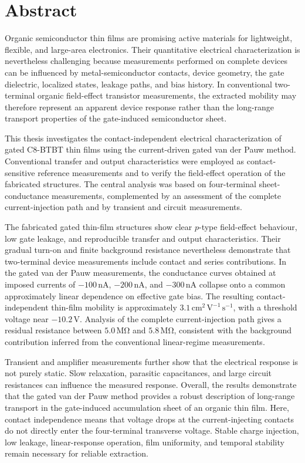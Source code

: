 \chapter*{Abstract}
\thispagestyle{plain}

Organic semiconductor thin films are promising active materials for lightweight,
flexible, and large-area electronics. Their quantitative electrical
characterization is nevertheless challenging because measurements performed on
complete devices can be influenced by metal-semiconductor contacts, device
geometry, the gate dielectric, localized states, leakage paths, and bias history.
In conventional two-terminal organic field-effect transistor measurements, the
extracted mobility may therefore represent an apparent device response rather
than the long-range transport properties of the gate-induced semiconductor
sheet.

This thesis investigates the contact-independent electrical characterization
of gated C8-BTBT thin films using the current-driven gated van der Pauw method.
Conventional transfer and output characteristics were employed as
contact-sensitive reference measurements and to verify the field-effect
operation of the fabricated structures. The central analysis was based on
four-terminal sheet-conductance measurements, complemented by an assessment of
the complete current-injection path and by transient and circuit measurements.

The fabricated gated thin-film structures show clear $p$-type field-effect
behaviour, low gate leakage, and reproducible transfer and output
characteristics. Their gradual turn-on and finite background resistance
nevertheless demonstrate that two-terminal device measurements include contact
and series contributions. In the gated van der Pauw measurements, the
conductance curves obtained at imposed currents of $-100\,\mathrm{nA}$,
$-200\,\mathrm{nA}$, and
$-300\,\mathrm{nA}$ collapse onto a common approximately linear dependence on
effective gate bias. The resulting contact-independent thin-film mobility is
approximately $3.1\,\mathrm{cm^2\,V^{-1}\,s^{-1}}$, with a threshold voltage
near $-10.2\,\mathrm{V}$. Analysis of the complete current-injection path gives
a residual resistance between $5.0\,\mathrm{M\Omega}$ and
$5.8\,\mathrm{M\Omega}$, consistent with the background contribution inferred
from the conventional linear-regime measurements.

Transient and amplifier measurements further show that the electrical response
is not purely static. Slow relaxation, parasitic capacitances, and large circuit
resistances can influence the measured response. Overall, the results
demonstrate that the gated van der Pauw method provides a robust description of
long-range transport in the gate-induced accumulation sheet of an organic thin
film. Here, contact independence means that voltage drops at the
current-injecting contacts do not directly enter the four-terminal transverse
voltage. Stable charge injection, low leakage, linear-response operation, film
uniformity, and temporal stability remain necessary for reliable extraction.